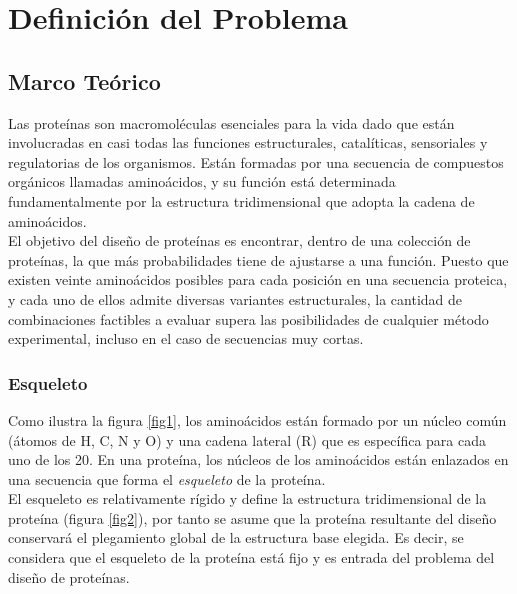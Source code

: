 \documentclass[letterpaper, 12pt]{report}
\begin{document}
\chapter{Definici\'on del Problema}

\section{Marco Te\'orico}

Las proteínas son macromol\'eculas esenciales para la vida dado que est\'an involucradas en casi todas las funciones estructurales,
catal\'iticas, sensoriales y regulatorias de los organismos. Est\'an formadas por una secuencia de compuestos org\'anicos llamadas aminoácidos,
y su función está determinada fundamentalmente por la estructura tridimensional que adopta la cadena de aminoácidos. \\  

El objetivo del diseño de proteínas es encontrar, dentro de una colección de proteínas, la que m\'as probabilidades tiene de ajustarse a una función.
Puesto que existen veinte aminoácidos posibles para cada posición en una secuencia proteica, y cada uno de ellos admite diversas variantes estructurales, 
la cantidad de combinaciones factibles a evaluar supera las posibilidades de cualquier método experimental, incluso en el caso de secuencias muy cortas.


\subsection{Esqueleto}

Como ilustra la figura \ref{fig1}, los aminoácidos est\'an formado por un n\'ucleo com\'un (\'atomos de H, C, N y O) y una
cadena lateral (R) que es espec\'ifica para cada uno de los 20. En una proteína, los núcleos de los amino\'acidos están
enlazados en una secuencia que forma el \textit{esqueleto} de la proteína. \\



El esqueleto es relativamente r\'igido y define la estructura tridimensional de la proteína (figura \ref{fig2}), por tanto se asume
que la proteína resultante del diseño conservar\'a el plegamiento global de la estructura base elegida. Es decir,
se considera que el esqueleto de la proteína está fijo y es entrada del problema del diseño de proteínas. \\

\newpage
\end{document}
